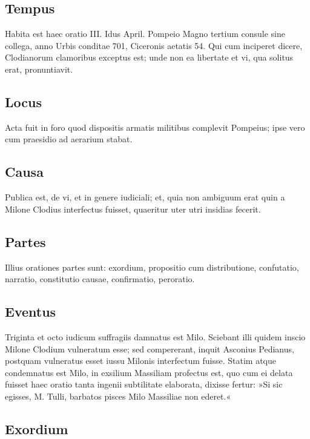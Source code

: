 \subsection*{Tempus}

Habita est haec oratio III. Idus April. Pompeio Magno tertium consule sine collega, anno Urbis conditae 701, Ciceronis aetatis 54. Qui cum inciperet dicere, Clodianorum clamoribus exceptus est; unde non ea libertate et vi, qua solitus erat, pronuntiavit.

\subsection*{Locus}

Acta fuit in foro quod dispositis armatis militibus complevit Pompeius; ipse vero cum praesidio ad aerarium stabat.

\subsection*{Causa}

Publica est, de vi, et in genere iudiciali; et, quia non ambiguum erat quin a Milone Clodius interfectus fuisset, quaeritur uter utri insidias fecerit.

\subsection*{Partes}

Illius orationes partes sunt: exordium, propositio cum distributione, confutatio, narratio, constitutio causae, confirmatio, peroratio.

\subsection*{Eventus}

Triginta et octo iudicum suffragiis damnatus est Milo. Sciebant illi quidem inscio Milone Clodium vulneratum esse; sed compererant, inquit Asconius Pedianus, postquam vulneratus esset iussu Milonis interfectum fuisse. Statim atque condemnatus est Milo, in exsilium Massiliam profectus est, quo cum ei delata fuisset haec oratio tanta ingenii subtilitate elaborata, dixisse fertur: »Si sic egisses, M. Tulli, barbatos pisces Milo Massiliae non ederet.«

\subsection*{Exordium}

